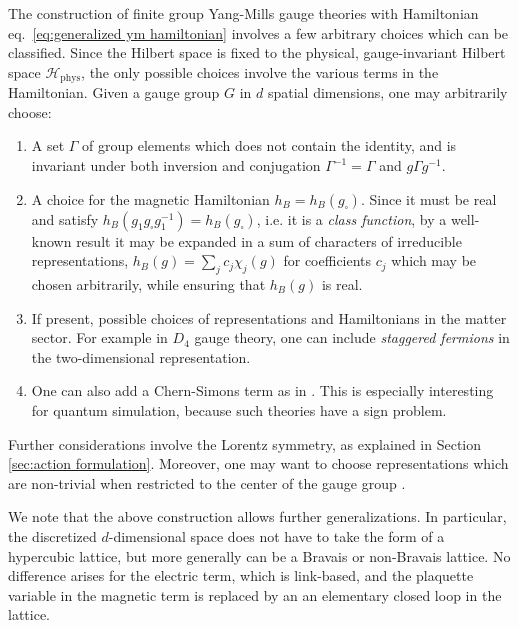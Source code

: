 The construction of finite group Yang-Mills gauge theories with Hamiltonian eq.~\eqref{eq:generalized ym hamiltonian} involves a few arbitrary choices which can be classified.
Since the Hilbert space is fixed to the physical, gauge-invariant Hilbert space $\mathcal{H}_{\mathrm{phys}}$, the only possible choices involve the various terms in the Hamiltonian.
Given a gauge group $G$ in $d$ spatial dimensions, one may arbitrarily choose:
\begin{enumerate}
    \item A set $\Gamma$ of group elements which does not contain the identity, and is invariant under both inversion and conjugation $\Gamma^{-1}=\Gamma$ and $g \Gamma g^{-1}$.

    \item A choice for the magnetic Hamiltonian $h_B = h_B(g_\square)$.
Since it must be real and satisfy $h_B(g_1 g_\square g_1^{-1})= h_B(g_\square)$, i.e.
it is a \textit{class function}, by a well-known result \cite{Serre} it may be expanded in a sum of characters of irreducible representations, $h_B(g) = \sum_j c_j \chi_j(g)$ for coefficients $c_j$ which may be chosen arbitrarily, while ensuring that $h_B(g)$ is real.
    \item If present, possible choices of representations and Hamiltonians in the matter sector.
For example in $D_4$ gauge theory, one can include \textit{staggered fermions} in the two-dimensional representation.

    \item One can also add a Chern-Simons term as in \cite{Caspar_Wiese}.
This is especially interesting for quantum simulation, because such theories have a sign problem.
\end{enumerate}
Further considerations involve the Lorentz symmetry, as explained in Section \ref{sec:action formulation}.
Moreover, one may want to choose representations which are non-trivial when restricted to the center of the gauge group \cite{CenterSymmetry, Cohen_2014}.

We note that the above construction allows further generalizations.
In particular, the discretized $d$-dimensional space does not have to take the form of a hypercubic lattice, but more generally can be a Bravais or non-Bravais lattice.
No difference arises for the electric term, which is link-based, and the plaquette variable in the magnetic term is replaced by an an elementary closed loop in the lattice.


